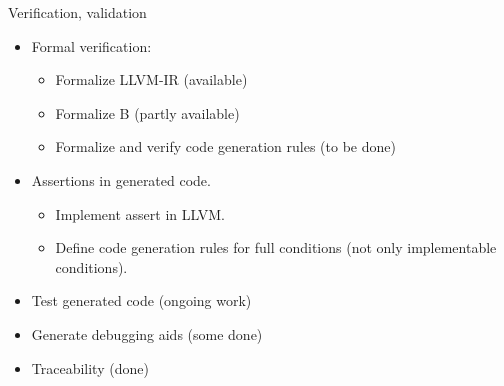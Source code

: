 \documentclass[12pt]{beamer}
\begin{document}


\begin{frame}{Verification, validation}

\begin{itemize}
  \item Formal verification:
    \begin{itemize}
    \item Formalize LLVM-IR (available)
    \item Formalize B (partly available)
    \item Formalize and verify code generation rules (to be done)
    \end{itemize}
  \item Assertions in generated code.
    \begin{itemize}
    \item Implement assert in LLVM.
    \item Define code generation rules for full conditions (not only
      implementable conditions).
    \end{itemize}
  \item Test generated code (ongoing work)
  \item Generate debugging aids (some done)
  \item Traceability (done)
\end{itemize}

\end{frame}
\end{document}
